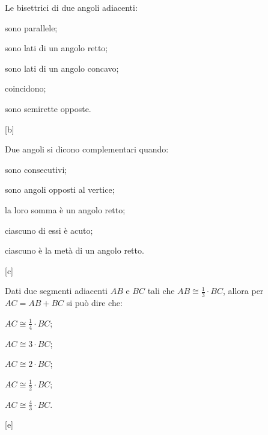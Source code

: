 \begin{esercizio}
\label{ese:1.69}
Le bisettrici di due angoli adiacenti:
\vspace{-.5em}
\begin{multicols}{2}
\begin{enumeratea}
\item sono parallele;
\item sono lati di un angolo retto;
\item sono lati di un angolo concavo;
\item coincidono;
\item sono semirette opposte.
\end{enumeratea}
\end{multicols}
\vspace{-18pt}
\hfill[b]
\end{esercizio}

\begin{esercizio}
\label{ese:1.70}
Due angoli si dicono complementari quando:
\vspace{-.5em}
\begin{multicols}{2}
\begin{enumeratea}
\item sono consecutivi;
\item sono angoli opposti al vertice;
\item la loro somma è un angolo retto;
\item ciascuno di essi è acuto;
\item ciascuno è la metà di un angolo retto.
\end{enumeratea}
\end{multicols}
\vspace{-18pt}
\hfill[c]
\end{esercizio}

\begin{esercizio}
\label{ese:1.71}
Dati due segmenti adiacenti \(AB\) e \(BC\) tali che \(AB\cong 
\frac{1}{3}\cdot BC\), allora per \(AC=AB+BC\) si può dire che:
\vspace{-.5em}
\begin{multicols}{3}
\begin{enumeratea}
\item \(AC\cong \frac{1}{4}\cdot BC\);
\item \(AC\cong 3\cdot BC\);
\item \(AC\cong 2\cdot BC\);
\item \(AC\cong \frac{1}{2}\cdot BC\);
\item \(AC\cong \frac{4}{3}\cdot BC\).
\end{enumeratea}
\end{multicols}
\vspace{-18pt}
\hfill[e]
\end{esercizio}

